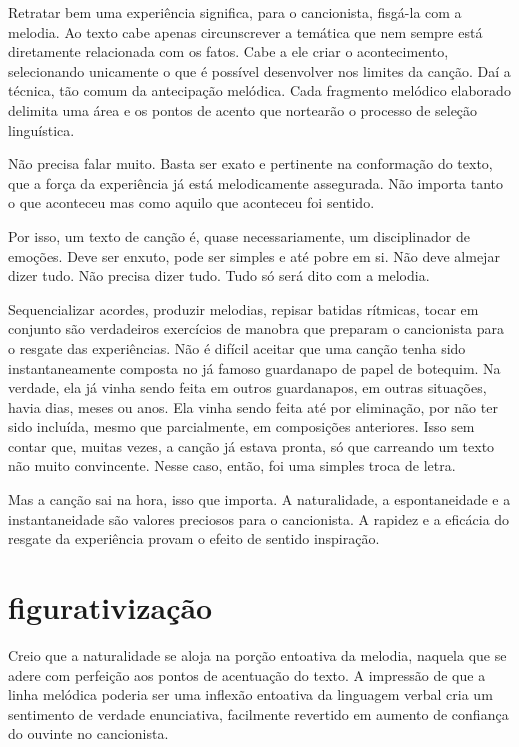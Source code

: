 Retratar bem uma experiência significa, para o cancionista, fisgá-la com
a melodia. Ao texto cabe apenas circunscrever a temática que nem sempre
está diretamente relacionada com os fatos. Cabe a ele criar o
acontecimento, selecionando unicamente o que é possível desenvolver nos
limites da canção. Daí a técnica, tão comum da antecipação melódica.
Cada fragmento melódico elaborado delimita uma área e os pontos de
acento que nortearão o processo de seleção linguística.

Não precisa falar muito. Basta ser exato e pertinente na conformação do
texto, que a força da experiência já está melodicamente assegurada. Não
importa tanto o que aconteceu mas como aquilo que aconteceu foi sentido.

Por isso, um texto de canção é, quase necessariamente, um disciplinador
de emoções. Deve ser enxuto, pode ser simples e até pobre em si. Não
deve almejar dizer tudo. Não precisa dizer tudo. Tudo só será dito com a
melodia.

Sequencializar acordes, produzir melodias, repisar batidas rítmicas,
tocar em conjunto são verdadeiros exercícios de manobra que preparam o
cancionista para o resgate das experiências. Não é difícil aceitar que
uma canção tenha sido instantaneamente composta no já famoso guardanapo
de papel de botequim. Na verdade, ela já vinha sendo feita em outros
guardanapos, em outras situações, havia dias, meses ou anos. Ela vinha
sendo feita até por eliminação, por não ter sido incluída, mesmo que
parcialmente, em composições anteriores. Isso sem contar que, muitas
vezes, a canção já estava pronta, só que carreando um texto não muito
convincente. Nesse caso, então, foi uma simples troca de letra.

Mas a canção sai na hora, isso que importa. A naturalidade, a
espontaneidade e a instantaneidade são valores preciosos para o
cancionista. A rapidez e a eficácia do resgate da experiência provam o
efeito de sentido inspiração.

\section{figurativização}

Creio que a naturalidade se aloja na porção entoativa da melodia,
naquela que se adere com perfeição aos pontos de acentuação do texto. A
impressão de que a linha melódica poderia ser uma inflexão entoativa da
linguagem verbal cria um sentimento de verdade enunciativa, facilmente
revertido em aumento de confiança do ouvinte no cancionista.


